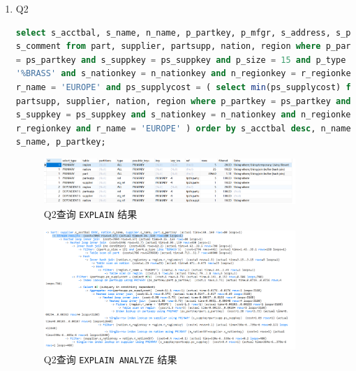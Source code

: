 \documentclass{article}
\renewcommand\tt{\texttt}
\begin{document}
\begin{enumerate}
\item Q2

\begin{lstlisting}[language=sql]
select s_acctbal, s_name, n_name, p_partkey, p_mfgr, s_address, s_phone,
s_comment from part, supplier, partsupp, nation, region where p_partkey
= ps_partkey and s_suppkey = ps_suppkey and p_size = 15 and p_type like
'%BRASS' and s_nationkey = n_nationkey and n_regionkey = r_regionkey and
r_name = 'EUROPE' and ps_supplycost = ( select min(ps_supplycost) from
partsupp, supplier, nation, region where p_partkey = ps_partkey and
s_suppkey = ps_suppkey and s_nationkey = n_nationkey and n_regionkey =
r_regionkey and r_name = 'EUROPE' ) order by s_acctbal desc, n_name,
s_name, p_partkey;
\end{lstlisting}

\begin{figure}[H]
\centering
\includegraphics[width=0.9\textwidth]{img/3.png}
\caption{Q2查询 \tt{EXPLAIN} 结果}
\end{figure}

\begin{figure}[H]
\centering
\includegraphics[width=0.9\textwidth]{img/4.png}
\caption{Q2查询 \tt{EXPLAIN ANALYZE} 结果}
\end{figure}


\end{enumerate}
\end{document}
